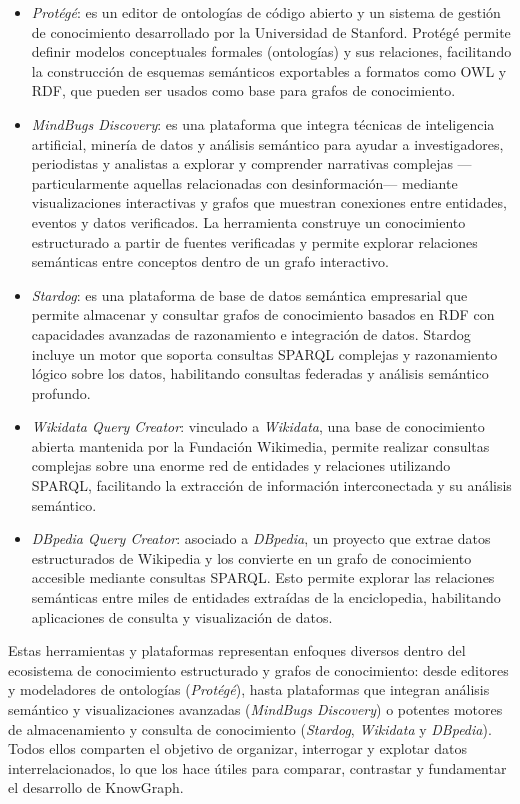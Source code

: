 \documentclass{article}
\begin{document}
\begin{itemize}
    \item \textit{Protégé}: es un editor de ontologías de código abierto y un sistema de gestión de conocimiento desarrollado por la Universidad de Stanford. Protégé permite definir modelos conceptuales formales (ontologías) y sus relaciones, facilitando la construcción de esquemas semánticos exportables a formatos como OWL y RDF, que pueden ser usados como base para grafos de conocimiento. 

    \item \textit{MindBugs Discovery}: es una plataforma que integra técnicas de inteligencia artificial, minería de datos y análisis semántico para ayudar a investigadores, periodistas y analistas a explorar y comprender narrativas complejas —particularmente aquellas relacionadas con desinformación— mediante visualizaciones interactivas y grafos que muestran conexiones entre entidades, eventos y datos verificados. La herramienta construye un conocimiento estructurado a partir de fuentes verificadas y permite explorar relaciones semánticas entre conceptos dentro de un grafo interactivo. 

    \item \textit{Stardog}: es una plataforma de base de datos semántica empresarial que permite almacenar y consultar grafos de conocimiento basados en RDF con capacidades avanzadas de razonamiento e integración de datos. Stardog incluye un motor que soporta consultas SPARQL complejas y razonamiento lógico sobre los datos, habilitando consultas federadas y análisis semántico profundo. 
    \item \textit{Wikidata Query Creator}: vinculado a \textit{Wikidata}, una base de conocimiento abierta mantenida por la Fundación Wikimedia, permite realizar consultas complejas sobre una enorme red de entidades y relaciones utilizando SPARQL, facilitando la extracción de información interconectada y su análisis semántico. 

    \item \textit{DBpedia Query Creator}: asociado a \textit{DBpedia}, un proyecto que extrae datos estructurados de Wikipedia y los convierte en un grafo de conocimiento accesible mediante consultas SPARQL. Esto permite explorar las relaciones semánticas entre miles de entidades extraídas de la enciclopedia, habilitando aplicaciones de consulta y visualización de datos. 
\end{itemize}

Estas herramientas y plataformas representan enfoques diversos dentro del ecosistema de conocimiento estructurado y grafos de conocimiento: desde editores y modeladores de ontologías (\textit{Protégé}), hasta plataformas que integran análisis semántico y visualizaciones avanzadas (\textit{MindBugs Discovery}) o potentes motores de almacenamiento y consulta de conocimiento (\textit{Stardog}, \textit{Wikidata} y \textit{DBpedia}). Todos ellos comparten el objetivo de organizar, interrogar y explotar datos interrelacionados, lo que los hace útiles para comparar, contrastar y fundamentar el desarrollo de KnowGraph.
\end{document}
